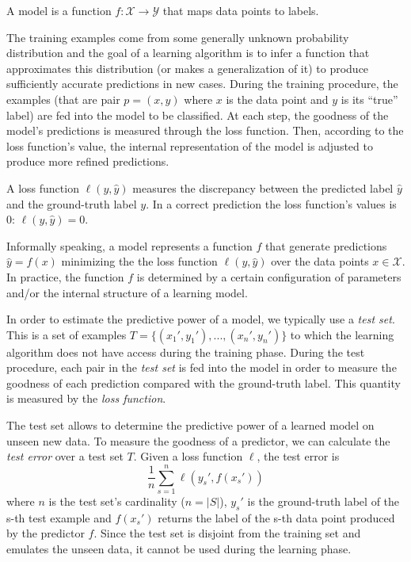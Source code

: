 \begin{definition}[Model]
	A model is a function $f:\mathcal{X} \to \mathcal{Y}$ that maps data points to labels. 
\end{definition}

The training examples come from some generally unknown probability distribution and the goal of a learning algorithm is to infer a function that approximates this distribution (or makes a generalization of it) to produce sufficiently accurate predictions in new cases. During the training procedure, the examples (that are pair $p = (x, y)$ where $x$ is the data point and $y$ is its ``true'' label) are fed into the model to be classified. At each step, the goodness of the model's predictions is measured through the loss function. Then, according to the loss function's value, the internal representation of the model is adjusted to produce more refined predictions.

\begin{definition}
	A loss function $\ell(y, \hat y)$ measures the discrepancy between the predicted label $\hat y$ and the ground-truth label $y$. In a correct prediction the loss function's values is $0$: $\ell (y, \hat y) = 0$.
\end{definition}

Informally speaking, a model represents a function $f$ that generate predictions $\hat y = f(x)$ minimizing the the loss function $\ell(y, \hat y)$ over the data points $x \in \mathcal{X}$. In practice, the function $f$ is determined by a certain configuration of parameters and/or the internal structure of a learning model.

In order to estimate the predictive power of a model, we typically use a \textit{test set}. This is a set of examples $T=\{(x_1', y_1'), ..., (x_n', y_n')\}$ to which the learning algorithm does not have access during the training phase. During the test procedure, each pair in the \textit{test set} is fed into the model in order to measure the goodness of each prediction compared with the ground-truth label. This quantity is measured by the \textit{loss function}. 

The test set allows to determine the predictive power of a learned model on unseen new data. To measure the goodness of a predictor, we can calculate the \textit{test error} over a test set $T$. Given a loss function $\ell$, the test error is
\begin{equation}
\frac{1}{n} \sum_{s=1}^{n}\ell(y_s', f(x_s'))
\end{equation}
where $n$ is the test set's cardinality ($n = |S|$), $y_s'$ is the ground-truth label of the s-th test example and $f(x_s')$ returns the label of the s-th data point produced by the predictor $f$. Since the test set is disjoint from the training set and emulates the unseen data, it cannot be used during the learning phase.

